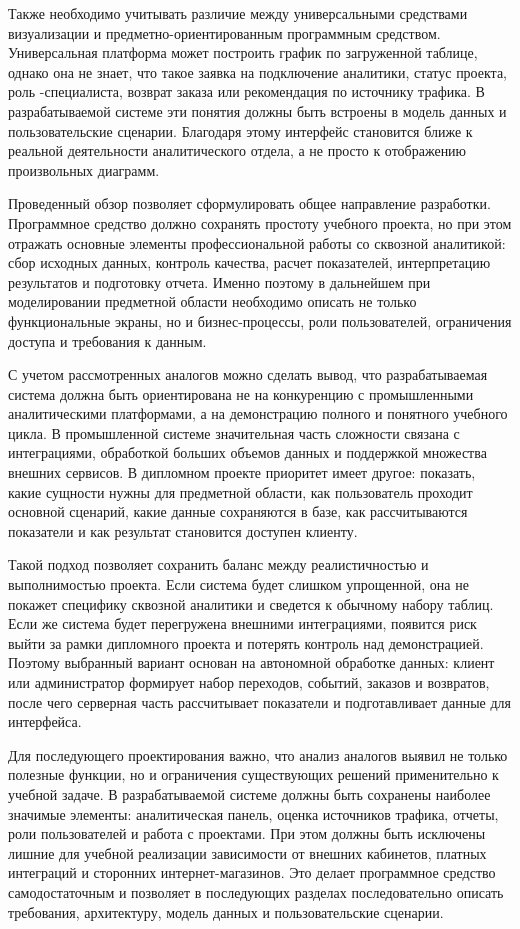 Также необходимо учитывать различие между универсальными средствами визуализации и предметно-ориентированным программным средством. Универсальная платформа может построить график по загруженной таблице, однако она не знает, что такое заявка на подключение аналитики, статус проекта, роль -специалиста, возврат заказа или рекомендация по источнику трафика. В разрабатываемой системе эти понятия должны быть встроены в модель данных и пользовательские сценарии. Благодаря этому интерфейс становится ближе к реальной деятельности аналитического отдела, а не просто к отображению произвольных диаграмм.

Проведенный обзор позволяет сформулировать общее направление разработки. Программное средство должно сохранять простоту учебного проекта, но при этом отражать основные элементы профессиональной работы со сквозной аналитикой: сбор исходных данных, контроль качества, расчет показателей, интерпретацию результатов и подготовку отчета. Именно поэтому в дальнейшем при моделировании предметной области необходимо описать не только функциональные экраны, но и бизнес-процессы, роли пользователей, ограничения доступа и требования к данным.

С учетом рассмотренных аналогов можно сделать вывод, что разрабатываемая система должна быть ориентирована не на конкуренцию с промышленными аналитическими платформами, а на демонстрацию полного и понятного учебного цикла. В промышленной системе значительная часть сложности связана с интеграциями, обработкой больших объемов данных и поддержкой множества внешних сервисов. В дипломном проекте приоритет имеет другое: показать, какие сущности нужны для предметной области, как пользователь проходит основной сценарий, какие данные сохраняются в базе, как рассчитываются показатели и как результат становится доступен клиенту.

Такой подход позволяет сохранить баланс между реалистичностью и выполнимостью проекта. Если система будет слишком упрощенной, она не покажет специфику сквозной аналитики и сведется к обычному набору таблиц. Если же система будет перегружена внешними интеграциями, появится риск выйти за рамки дипломного проекта и потерять контроль над демонстрацией. Поэтому выбранный вариант основан на автономной обработке данных: клиент или администратор формирует набор переходов, событий, заказов и возвратов, после чего серверная часть рассчитывает показатели и подготавливает данные для интерфейса.

Для последующего проектирования важно, что анализ аналогов выявил не только полезные функции, но и ограничения существующих решений применительно к учебной задаче. В разрабатываемой системе должны быть сохранены наиболее значимые элементы: аналитическая панель, оценка источников трафика, отчеты, роли пользователей и работа с проектами. При этом должны быть исключены лишние для учебной реализации зависимости от внешних кабинетов, платных интеграций и сторонних интернет-магазинов. Это делает программное средство самодостаточным и позволяет в последующих разделах последовательно описать требования, архитектуру, модель данных и пользовательские сценарии.

